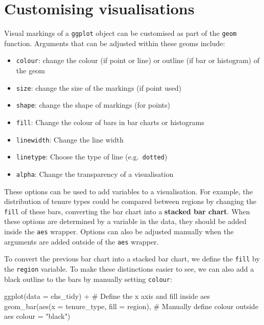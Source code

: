 \documentclass[
  letterpaper,
  DIV=11,
  numbers=noendperiod]{scrreprt}
\newenvironment{Shaded}{\begin{snugshade}}{\end{snugshade}}
\newcommand{\AttributeTok}[1]{\textcolor[rgb]{0.40,0.45,0.13}{#1}}
\newcommand{\CommentTok}[1]{\textcolor[rgb]{0.37,0.37,0.37}{#1}}
\newcommand{\FunctionTok}[1]{\textcolor[rgb]{0.28,0.35,0.67}{#1}}
\newcommand{\NormalTok}[1]{\textcolor[rgb]{0.00,0.23,0.31}{#1}}
\newcommand{\SpecialCharTok}[1]{\textcolor[rgb]{0.37,0.37,0.37}{#1}}
\newcommand{\StringTok}[1]{\textcolor[rgb]{0.13,0.47,0.30}{#1}}
\providecommand{\tightlist}{%
  \setlength{\itemsep}{0pt}\setlength{\parskip}{0pt}}\usepackage{longtable,booktabs,array}
\begin{document}
\section{Customising visualisations}\label{customising-visualisations}

Visual markings of a \texttt{ggplot} object can be customised as part of
the \texttt{geom} function. Arguments that can be adjusted within these
geoms include:

\begin{itemize}
\tightlist
\item
  \texttt{colour}: change the colour (if point or line) or outline (if
  bar or histogram) of the geom
\item
  \texttt{size}: change the size of the markings (if point used)
\item
  \texttt{shape}: change the shape of markings (for points)
\item
  \texttt{fill}: Change the colour of bars in bar charts or histograms
\item
  \texttt{linewidth}: Change the line width
\item
  \texttt{linetype}: Choose the type of line (e.g.~\texttt{dotted})
\item
  \texttt{alpha}: Change the transparency of a visualisation
\end{itemize}

These options can be used to add variables to a visualisation. For
example, the distribution of tenure types could be compared between
regions by changing the \texttt{fill} of these bars, converting the bar
chart into a \textbf{stacked bar chart}. When these options are
determined by a variable in the data, they should be added inside the
\texttt{aes} wrapper. Options can also be adjusted manually when the
arguments are added outside of the \texttt{aes} wrapper.

To convert the previous bar chart into a stacked bar chart, we define
the \texttt{fill} by the \texttt{region} variable. To make these
distinctions easier to see, we can also add a black outline to the bars
by manually setting \texttt{colour}:

\begin{Shaded}
\begin{Highlighting}[]
\FunctionTok{ggplot}\NormalTok{(}\AttributeTok{data =}\NormalTok{ ehs\_tidy) }\SpecialCharTok{+} 
  \CommentTok{\# Define the x axis and fill inside aes}
  \FunctionTok{geom\_bar}\NormalTok{(}\FunctionTok{aes}\NormalTok{(}\AttributeTok{x =}\NormalTok{ tenure\_type, }\AttributeTok{fill =}\NormalTok{ region),}
           \CommentTok{\# Manually define colour outside aes}
           \AttributeTok{colour =} \StringTok{"black"}\NormalTok{)}
\end{Highlighting}
\end{Shaded}
\end{document}
